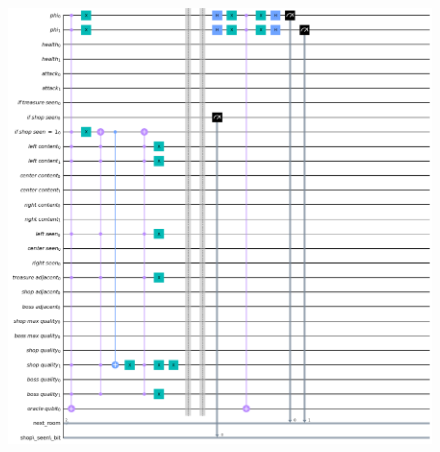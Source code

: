 \documentclass{book}
\theoremstyle{definition}
\theoremstyle{definition}
\theoremstyle{definition}
\theoremstyle{plain}
\theoremstyle{plain}
\theoremstyle{plain}
\theoremstyle{plain}
\begin{document}
\begin{figure}[H]
\begin{center}
    \includegraphics[width=16cm]{immagini_circuito_8_stanze/mega_circ_10.png}
\end{center}
\end{figure}


%

%
 
\end{document}

